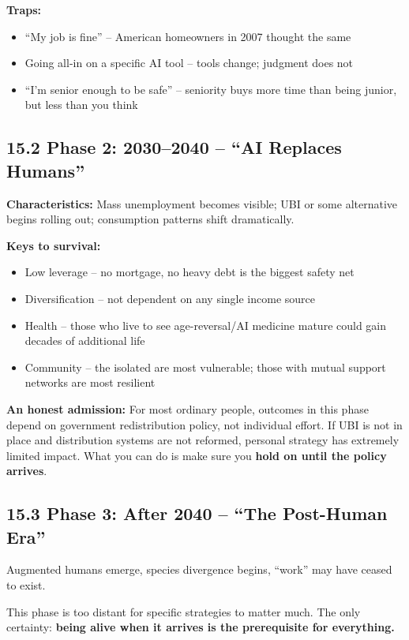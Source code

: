 \documentclass[11pt,a4paper]{article}
\begin{document}
\textbf{Traps:}

\begin{itemize}
  \item ``My job is fine'' -- American homeowners in 2007 thought the same
  \item Going all-in on a specific AI tool -- tools change; judgment does not
  \item ``I'm senior enough to be safe'' -- seniority buys more time than being junior, but less than you think
\end{itemize}

\subsection{15.2 Phase 2: 2030--2040 -- ``AI Replaces Humans''}

\textbf{Characteristics:} Mass unemployment becomes visible; UBI or some alternative begins rolling out; consumption patterns shift dramatically.

\textbf{Keys to survival:}

\begin{itemize}
  \item Low leverage -- no mortgage, no heavy debt is the biggest safety net
  \item Diversification -- not dependent on any single income source
  \item Health -- those who live to see age-reversal/AI medicine mature could gain decades of additional life
  \item Community -- the isolated are most vulnerable; those with mutual support networks are most resilient
\end{itemize}

\textbf{An honest admission:} For most ordinary people, outcomes in this phase depend on government redistribution policy, not individual effort. If UBI is not in place and distribution systems are not reformed, personal strategy has extremely limited impact. What you can do is make sure you \textbf{hold on until the policy arrives}.

\subsection{15.3 Phase 3: After 2040 -- ``The Post-Human Era''}

Augmented humans emerge, species divergence begins, ``work'' may have ceased to exist.

This phase is too distant for specific strategies to matter much. The only certainty: \textbf{being alive when it arrives is the prerequisite for everything.}
\end{document}
